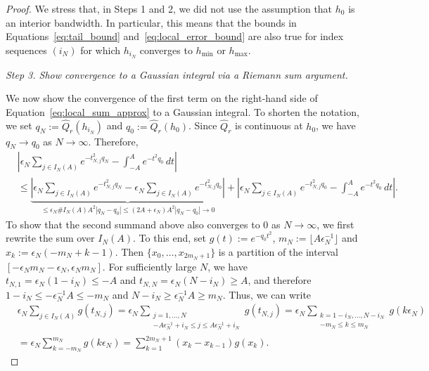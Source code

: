 \begin{proof}
    We stress that, in Steps 1 and 2, we did not use the assumption that $h_0$ is an interior bandwidth. In particular, this means that the bounds in Equations~\eqref{eq:tail_bound} and~\eqref{eq:local_error_bound} are also true for index sequences $(i_N)$ for which $h_{i_N}$ converges to $h_{\min}$ or $h_{\max}$.

    \textit{Step 3. Show convergence to a Gaussian integral via a Riemann sum argument.}

    We now show the convergence of the first term on the right-hand side of Equation~\eqref{eq:local_sum_approx} to a Gaussian integral. To shorten the notation, we set $q_N:=\hat{Q}_r(h_{i_N})$ and $q_0:=\hat{Q}_r(h_0)$. Since $\hat{Q}_r$ is continuous at $h_0$, we have $q_N\to q_0$ as $N\to\infty$. Therefore,
    \begin{equation}\label{eq:help_help005}
        \begin{aligned}
            &\left|\epsilon_N\sum_{j\in I_N(A)}e^{-t_{N,j}^2q_N}-\int_{-A}^{A}e^{-t^2q_0}\,dt\right|\\&\le\underbrace{\left|\epsilon_N\sum_{j\in I_N(A)}e^{-t_{N,j}^2q_N}-\epsilon_N\sum_{j\in I_N(A)}e^{-t_{N,j}^2q_0}\right|}_{\le\epsilon_N\#I_N(A)A^2|q_N-q_0|\le(2A+\epsilon_N)A^2|q_N-q_0|\to0}+\left|\epsilon_N\sum_{j\in I_N(A)}e^{-t_{N,j}^2q_0}-\int_{-A}^{A}e^{-t^2q_0}\,dt\right|.
        \end{aligned}
    \end{equation}
    To show that the second summand above also converges to $0$ as $N\to\infty$, we first rewrite the sum over $I_N(A)$. To this end, set $g(t):=e^{-q_0t^2}$, $m_N:=\lfloor A\epsilon_N^{-1}\rfloor$ and $x_k:=\epsilon_N(-m_N+k-1)$. Then $\{x_0,\dots,x_{2m_N+1}\}$ is a partition of the interval $[-\epsilon_Nm_N-\epsilon_N,\epsilon_Nm_N]$. For sufficiently large $N$, we have $t_{N,1}=\epsilon_N(1-i_N)\le-A$ and $t_{N,N}=\epsilon_N(N-i_N)\ge A$, and therefore $1-i_N\le-\epsilon_N^{-1}A\le-m_N$ and $N-i_N\ge\epsilon_N^{-1}A\ge m_N$. Thus, we can write
    \begin{align*}
        &\epsilon_N\sum_{j\in I_N(A)}g(t_{N,j})=\epsilon_N\sum_{\substack{j=1,\dots,N\\-A\epsilon_N^{-1}+i_N\le j\le A\epsilon_N^{-1}+i_N}}g(t_{N,j})=\epsilon_N\sum_{\substack{k=1-i_N,\dots,N-i_N\\
        -m_N\le k\le m_N}}g(k\epsilon_N)
        \\&
        =\epsilon_N\sum_{k=-m_N}^{m_N}g(k\epsilon_N)
        =\sum_{k=1}^{2m_N+1}(x_k-x_{k-1})g(x_k).
    \end{align*}

\end{proof}
